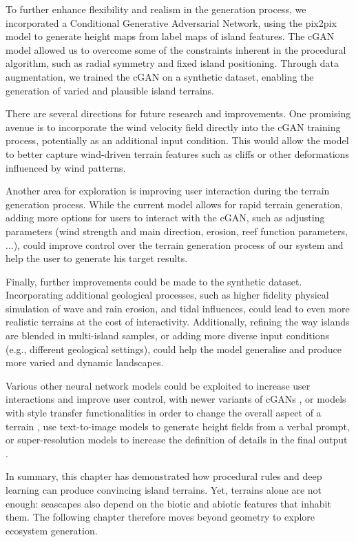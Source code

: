 To further enhance flexibility and realism in the generation process, we incorporated a Conditional Generative Adversarial Network, using the pix2pix model to generate height maps from label maps of island features. The cGAN model allowed us to overcome some of the constraints inherent in the procedural algorithm, such as radial symmetry and fixed island positioning. Through data augmentation, we trained the cGAN on a synthetic dataset, enabling the generation of varied and plausible island terrains.


There are several directions for future research and improvements. One promising avenue is to incorporate the wind velocity field directly into the cGAN training process, potentially as an additional input condition. This would allow the model to better capture wind-driven terrain features such as cliffs or other deformations influenced by wind patterns.

Another area for exploration is improving user interaction during the terrain generation process. While the current model allows for rapid terrain generation, adding more options for users to interact with the cGAN, such as adjusting parameters (wind strength and main direction, erosion, reef function parameters, ...), could improve control over the terrain generation process of our system and help the user to generate his target results.

Finally, further improvements could be made to the synthetic dataset. Incorporating additional geological processes, such as higher fidelity physical simulation of wave and rain erosion, and tidal influences, could lead to even more realistic terrains at the cost of interactivity. Additionally, refining the way islands are blended in multi-island samples, or adding more diverse input conditions (e.g., different geological settings), could help the model generalise and produce more varied and dynamic landscapes.

Various other neural network models could be exploited to increase user interactions and improve user control, with newer variants of cGANs \cite{Park2019}, or models with style transfer functionalities \cite{Gatys2015,Zhu2020} in order to change the overall aspect of a terrain \cite{Perche2023a,Perche2023b}, use text-to-image models \cite{Rombach2021,Radford2021} to generate height fields from a verbal prompt, or super-resolution models \cite{Dong2014} to increase the definition of details in the final output \cite{Guerin2016a}.

In summary, this chapter has demonstrated how procedural rules and deep learning can produce convincing island terrains. Yet, terrains alone are not enough: seascapes also depend on the biotic and abiotic features that inhabit them. The following chapter therefore moves beyond geometry to explore ecosystem generation.


